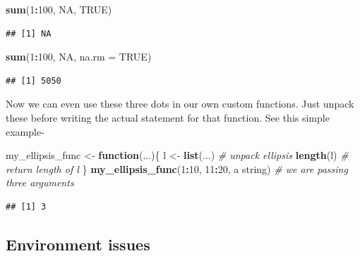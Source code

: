 \documentclass[
]{book}
\newenvironment{Shaded}{\begin{snugshade}}{\end{snugshade}}
\newcommand{\AttributeTok}[1]{\textcolor[rgb]{0.13,0.29,0.53}{#1}}
\newcommand{\CommentTok}[1]{\textcolor[rgb]{0.56,0.35,0.01}{\textit{#1}}}
\newcommand{\ConstantTok}[1]{\textcolor[rgb]{0.56,0.35,0.01}{#1}}
\newcommand{\ControlFlowTok}[1]{\textcolor[rgb]{0.13,0.29,0.53}{\textbf{#1}}}
\newcommand{\DecValTok}[1]{\textcolor[rgb]{0.00,0.00,0.81}{#1}}
\newcommand{\FunctionTok}[1]{\textcolor[rgb]{0.13,0.29,0.53}{\textbf{#1}}}
\newcommand{\NormalTok}[1]{#1}
\newcommand{\OtherTok}[1]{\textcolor[rgb]{0.56,0.35,0.01}{#1}}
\newcommand{\SpecialCharTok}[1]{\textcolor[rgb]{0.81,0.36,0.00}{\textbf{#1}}}
\newcommand{\StringTok}[1]{\textcolor[rgb]{0.31,0.60,0.02}{#1}}
\begin{document}
\begin{Shaded}
\begin{Highlighting}[]
\FunctionTok{sum}\NormalTok{(}\DecValTok{1}\SpecialCharTok{:}\DecValTok{100}\NormalTok{, }\ConstantTok{NA}\NormalTok{, }\ConstantTok{TRUE}\NormalTok{)}
\end{Highlighting}
\end{Shaded}

\begin{verbatim}
## [1] NA
\end{verbatim}

\begin{Shaded}
\begin{Highlighting}[]
\FunctionTok{sum}\NormalTok{(}\DecValTok{1}\SpecialCharTok{:}\DecValTok{100}\NormalTok{, }\ConstantTok{NA}\NormalTok{, }\AttributeTok{na.rm =} \ConstantTok{TRUE}\NormalTok{)}
\end{Highlighting}
\end{Shaded}

\begin{verbatim}
## [1] 5050
\end{verbatim}

Now we can even use these three dots in our own custom functions. Just unpack these before writing the actual statement for that function. See this simple example-

\begin{Shaded}
\begin{Highlighting}[]
\NormalTok{my\_ellipsis\_func }\OtherTok{\textless{}{-}} \ControlFlowTok{function}\NormalTok{(...)\{}
\NormalTok{  l }\OtherTok{\textless{}{-}} \FunctionTok{list}\NormalTok{(...) }\CommentTok{\# unpack ellipsis}
  \FunctionTok{length}\NormalTok{(l) }\CommentTok{\# return length of l}
\NormalTok{\}}
\FunctionTok{my\_ellipsis\_func}\NormalTok{(}\DecValTok{1}\SpecialCharTok{:}\DecValTok{10}\NormalTok{, }\DecValTok{11}\SpecialCharTok{:}\DecValTok{20}\NormalTok{, }\StringTok{\textquotesingle{}a string\textquotesingle{}}\NormalTok{) }\CommentTok{\# we are passing three arguments}
\end{Highlighting}
\end{Shaded}

\begin{verbatim}
## [1] 3
\end{verbatim}

\hypertarget{environment-issues}{%
\subsection*{Environment issues}\label{environment-issues}}
\end{document}
